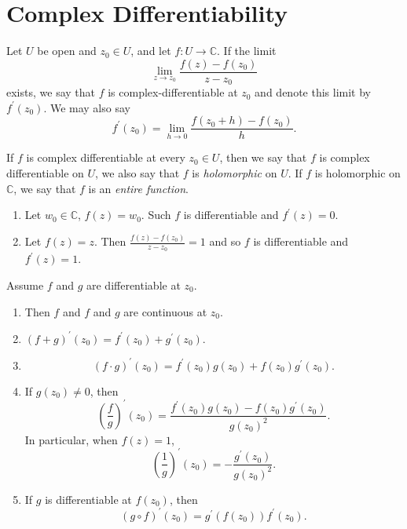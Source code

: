 \section{Complex Differentiability}

Let $U$ be open and $z_0 \in U$, and let
$f : U \to \mathbb{C}$. If the limit
$$
\lim_{z \to z_0} \frac{f(z) - f(z_0)}{z - z_0}
$$
exists, we say that $f$ is complex-differentiable at
$z_0$ and denote this limit by $f^\prime(z_0)$. We may also say
$$
f^\prime(z_0) = \lim_{h \to 0} \frac{f(z_0 + h) - f(z_0)}{h}.
$$

\begin{defn}
If $f$ is complex differentiable at every $z_0 \in U$, then
we say that $f$ is complex differentiable on $U$, we also say
that $f$ is \emph{holomorphic} on $U$. If $f$ is holomorphic on
$\mathbb{C}$, we say that $f$ is an \emph{entire function}.
\end{defn}

\begin{xmpl}
  \begin{enumerate}
    \item{
      Let $w_0 \in \mathbb{C}$, $f(z) = w_0$. Such $f$ is
      differentiable and $f^\prime(z) = 0$.
    }
    \item{
      Let $f(z) = z$. Then $\frac{f(z) - f(z_0)}{z - z_0} = 1$
      and so $f$ is differentiable and $f^\prime(z) = 1$.
    }
  \end{enumerate}
\end{xmpl}

\begin{obsv}
  Assume $f$ and $g$ are differentiable at $z_0$.
  \begin{enumerate}
    \item{ Then $f$ and
      $f$ and $g$ are continuous at $z_0$.
    }
    \item{
      $(f + g)^\prime(z_0) = f^\prime(z_0) + g^\prime(z_0)$.
    }
    \item{
      $$
      (f\cdot g)^\prime(z_0) = f^\prime(z_0) g(z_0) + f(z_0) g^\prime(z_0).
      $$
    }
    \item{
      If $g(z_0) \neq 0$, then
      $$
        \left(\frac{f}{g}\right)^\prime(z_0)
      = \frac{f^\prime(z_0) g(z_0) - f(z_0) g^\prime(z_0)}{g(z_0)^2}.
      $$
      In particular, when $f(z) = 1$,
      $$
      \left(\frac{1}{g}\right)^\prime(z_0) = -\frac{g^\prime(z_0)}{g(z_0)^2}.
      $$
    }
    \item{
      If $g$ is differentiable at $f(z_0)$, then
      $$
      (g \circ f)^\prime(z_0) = g^\prime(f(z_0)) f^\prime(z_0).
      $$
    }
  \end{enumerate}
\end{obsv}

